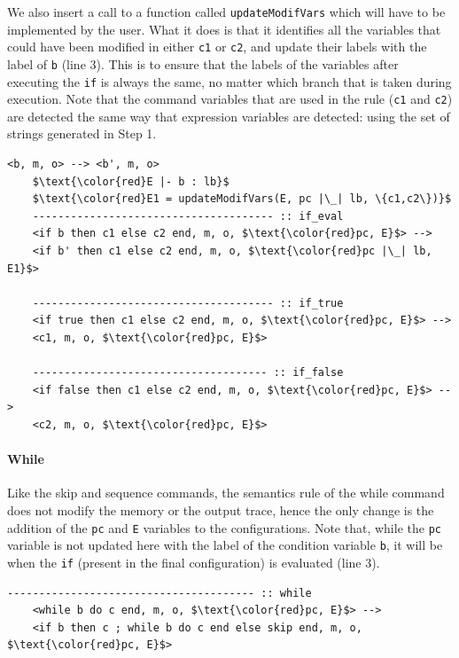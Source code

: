 \documentclass[conference]{IEEEtran}
\begin{document}
We also insert a call to a function called \lstinline{updateModifVars} which will have to be implemented by the user. What it does is that it identifies all the variables that could have been modified in either \lstinline{c1} or \lstinline{c2}, and update their labels with the label of \lstinline{b} (line 3). This is to ensure that the labels of the variables after executing the \lstinline{if} is always the same, no matter which branch that is taken during execution. Note that the command variables that are used in the rule (\lstinline{c1} and \lstinline{c2}) are detected the same way that expression variables are detected: using the set of strings generated in Step 1.
\begin{lstlisting}[label=listing:output-semantics-if,numbers=right,captionpos=b,caption=Ott-IFC's output for the "if" command]
	<b, m, o> --> <b', m, o>
	$\text{\color{red}E |- b : lb}$
	$\text{\color{red}E1 = updateModifVars(E, pc |\_| lb, \{c1,c2\})}$
	-------------------------------------- :: if_eval
	<if b then c1 else c2 end, m, o, $\text{\color{red}pc, E}$> --> 
	<if b' then c1 else c2 end, m, o, $\text{\color{red}pc |\_| lb, E1}$>
	
	-------------------------------------- :: if_true
	<if true then c1 else c2 end, m, o, $\text{\color{red}pc, E}$> --> 
	<c1, m, o, $\text{\color{red}pc, E}$>
	
	------------------------------------- :: if_false
	<if false then c1 else c2 end, m, o, $\text{\color{red}pc, E}$> --> 
	<c2, m, o, $\text{\color{red}pc, E}$>
\end{lstlisting}

\paragraph{While} Like the skip and sequence commands, the semantics rule of the while command does not modify the memory or the output trace, hence the only change is the addition of the \lstinline{pc} and \lstinline{E} variables to the configurations. Note that, while the \lstinline{pc} variable is not updated here with the label of the condition variable \lstinline{b}, it will be when the \lstinline{if} (present in the final configuration) is evaluated (line 3). 
\begin{lstlisting}[label=listing:output-semantics-while,numbers=right,captionpos=b,caption=Ott-IFC's output for the "while" command]
	--------------------------------------- :: while
	<while b do c end, m, o, $\text{\color{red}pc, E}$> --> 
	<if b then c ; while b do c end else skip end, m, o, $\text{\color{red}pc, E}$>
\end{lstlisting}
\end{document}
